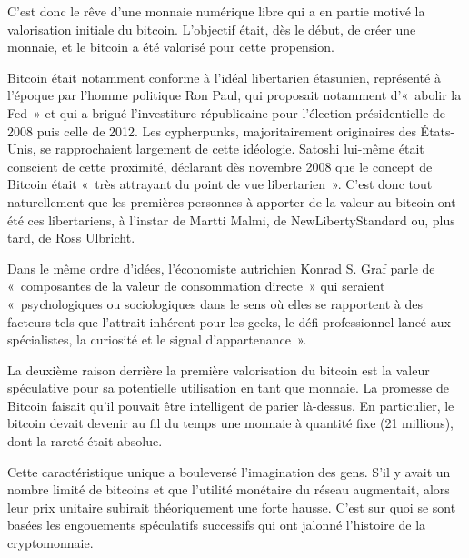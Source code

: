 C'est donc le rêve d'une monnaie numérique libre qui a en partie motivé la valorisation initiale du bitcoin. L'objectif était, dès le début, de créer une monnaie, et le bitcoin a été valorisé pour cette propension. 

Bitcoin était notamment conforme à l'idéal libertarien étasunien, représenté à l'époque par l'homme politique Ron Paul, qui proposait notamment d'«~abolir la Fed~» et qui a brigué l'investiture républicaine pour l'élection présidentielle de 2008 puis celle de 2012. Les cypherpunks, majoritairement originaires des États-Unis, se rapprochaient largement de cette idéologie. Satoshi lui-même était conscient de cette proximité, déclarant dès novembre 2008 que le concept de Bitcoin était «~très attrayant du point de vue libertarien~». C'est donc tout naturellement que les premières personnes à apporter de la valeur au bitcoin ont été ces libertariens, à l'instar de Martti Malmi, de NewLibertyStandard ou, plus tard, de Ross Ulbricht.

Dans le même ordre d'idées, l'économiste autrichien Konrad S. Graf parle de «~composantes de la valeur de consommation directe~» qui seraient «~psychologiques ou sociologiques dans le sens où elles se rapportent à des facteurs tels que l'attrait inhérent pour les geeks, le défi professionnel lancé aux spécialistes, la curiosité et le signal d'appartenance~».


La deuxième raison derrière la première valorisation du bitcoin est la valeur spéculative pour sa potentielle utilisation en tant que monnaie. La promesse de Bitcoin faisait qu'il pouvait être intelligent de parier là-dessus. En particulier, le bitcoin devait devenir au fil du temps une monnaie à quantité fixe (21 millions), dont la rareté était absolue.

Cette caractéristique unique a bouleversé l'imagination des gens. S'il y avait un nombre limité de bitcoins et que l'utilité monétaire du réseau augmentait, alors leur prix unitaire subirait théoriquement une forte hausse. C'est sur quoi se sont basées les engouements spéculatifs successifs qui ont jalonné l'histoire de la cryptomonnaie.

